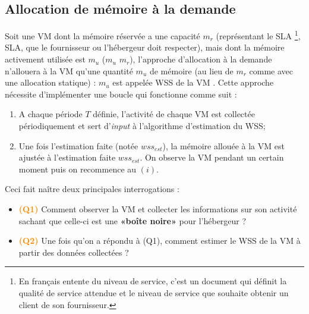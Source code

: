 \subsection{Allocation de mémoire à la demande}
Soit une VM dont la mémoire réservée a une capacité $\textit{m}_\textit{r}$ (représentant le \acs{SLA} \footnote{En français entente du niveau de service, c'est un document qui définit la qualité de service attendue et le niveau de service que souhaite obtenir un client de son fournisseur.}, \acl{SLA}, que le fournisseur ou l'hébergeur doit respecter), mais dont la mémoire activement utilisée est $\textit{m}_\textit{u}$ ($\textit{m}_\textit{u}$ \leq $\textit{m}_\textit{r}$), l'approche d'allocation à la demande n'allouera à la VM qu'une quantité $\textit{m}_\textit{u}$ de mémoire (au lieu de $\textit{m}_\textit{r}$ comme avec une allocation statique) : $\textit{m}_\textit{u}$ est appelée \ac{WSS} de la VM \cite{article9}. Cette approche nécessite d'implémenter une boucle qui fonctionne comme suit :
\begin{enumerate}[label=(\roman*)]
    \item A chaque période $T$ définie, l'activité de chaque VM est collectée périodiquement et sert d'\textit{input} à l'algorithme d'estimation du WSS;
    \item Une fois l'estimation faite (notée $\textit{wss}_\textit{est}$), la mémoire allouée à la VM est ajustée à l'estimation faite $\textit{wss}_\textit{est}$. On observe la VM pendant un certain moment puis on recommence au $(i)$.
\end{enumerate}
Ceci fait naître deux principales interrogations : 
\begin{itemize}[label=, font=\large \color{darkorange}]
    \item \textbf{\large{\textcolor{darkorange}{(Q1)}}} Comment observer la VM et collecter les informations sur son activité sachant que celle-ci est une \textbf{«boîte noire»} pour l'hébergeur ?\\
    \item \textbf{\large{\textcolor{darkorange}{(Q2)}}} Une fois qu'on a répondu à (Q1), comment estimer le WSS de la VM à partir des données collectées ? \\
\end{itemize}
\par\noindent

